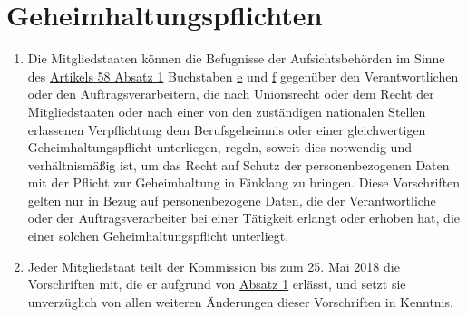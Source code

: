 \chapter{Geheimhaltungspflichten}
\label{ch:90}


\begin{enumerate}

  \item Die Mitgliedstaaten können die Befugnisse der Aufsichtsbehörden im Sinne des \hyperref[itm:58-1]{Artikels 58
   Absatz 1} Buchstaben \hyperref[itm:58-1e]{e} und \hyperref[itm:58-1f]{f} gegenüber den Verantwortlichen oder den
   Auftragsverarbeitern, die nach Unionsrecht oder dem Recht der Mitgliedstaaten oder nach einer von den zuständigen
   nationalen Stellen erlassenen Verpflichtung dem Berufsgeheimnis oder einer gleichwertigen Geheimhaltungspflicht
   unterliegen, regeln, soweit dies notwendig und verhältnismäßig ist, um das Recht auf Schutz der personenbezogenen
   Daten mit der Pflicht zur Geheimhaltung in Einklang zu bringen. Diese Vorschriften gelten nur in Bezug auf
   \hyperref[itm:04-1]{personenbezogene Daten}, die der Verantwortliche oder der Auftragsverarbeiter bei einer Tätigkeit erlangt oder
   erhoben hat, die einer solchen Geheimhaltungspflicht unterliegt.
  \label{itm:90-1}

  \item Jeder Mitgliedstaat teilt der Kommission bis zum 25. Mai 2018 die Vorschriften mit, die er aufgrund von
   \hyperref[itm:90-1]{Absatz 1} erlässt, und setzt sie unverzüglich von allen weiteren Änderungen dieser Vorschriften
    in Kenntnis.
  \label{itm:90-2}

\end{enumerate}


